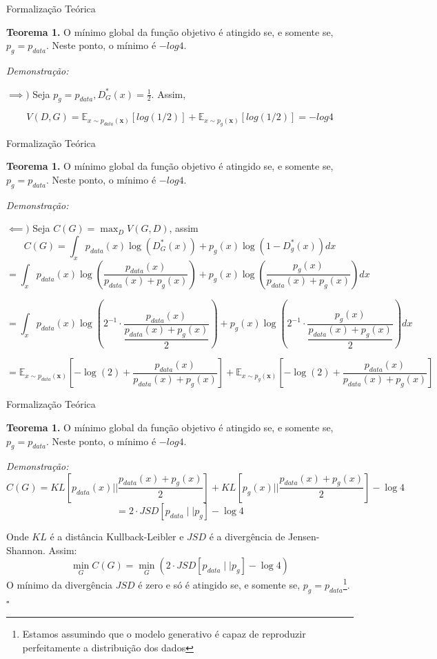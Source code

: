 \documentclass[10pt]{beamer}
\newcommand*{\QEDB}{\hfill\ensuremath{\square}}%
\begin{document}
\begin{frame}[fragile]{Formalização Teórica}

	\textbf{Teorema 1.} O mínimo global da função objetivo
	é atingido se, e somente se, $p_g = p_{data}$. Neste ponto,
	o mínimo é $-log4$.

	\textit{Demonstração:}

	$
	\implies )$
	Seja $p_g = p_{data}, D^*_G(x) = \frac{1}{2}$. Assim,

  $$V(D,G)=
    \mathbb{E}_{x\sim p_{data}(\bm x)}\left[log (1/2) \right]+
    \mathbb{E}_{x\sim p_g(\bm x)}\left[log(1/2)\right] =  -log4
  $$


\end{frame}

\begin{frame}[fragile]{Formalização Teórica}

\small
	\textbf{Teorema 1.} O mínimo global da função objetivo
	é atingido se, e somente se, $p_g = p_{data}$. Neste ponto,
	o mínimo é $-log4$.

	\textit{Demonstração:}

	$
	\impliedby )$ Seja $C(G) = \max_{D}V(G,D)$, assim
  $$C(G) = \int_{x}p_{data}(x)\log{\left(D_{G}^{*}(x)\right)}
  + p_{g}(x)\log{\left(1-D_{g}^{*}(x)\right)}dx $$
  $$
  = \int_{x}p_{data}(x)\log{\left(\dfrac{p_{data}(x)}{p_{data}(x)
  + p_{g}(x)}\right)} + p_{g}(x)\log{\left(\dfrac{p_{g}(x)}{p_{data}(x)
  + p_{g}(x)}\right)}dx $$

  $$= \int_{x}p_{data}(x)
  \log{\left(2^{-1}\cdot \dfrac{p_{data}(x)}{\dfrac{p_{data}(x)
  + p_{g}(x)}{2}}\right)} + p_{g}(x)
  \log{\left(2^{-1}\cdot \dfrac{p_{g}(x)}{\dfrac{p_{data}(x)
  + p_{g}(x)}{2}}\right)}dx	$$

  $$=
    \mathbb{E}_{x\sim p_{data}(\bm x)}\left[-\log (2)+
    \frac{p_{data}(x)}{p_{data}(x)+p_g(x)}\right]+
    \mathbb{E}_{x\sim p_g(\bm x)}\left[-\log(2)+
    \frac{p_{data}(x)}{p_{data}(x)+p_g(x)}\right]
  $$

\end{frame}

\begin{frame}[fragile]{Formalização Teórica}

\small
	\textbf{Teorema 1.} O mínimo global da função objetivo
	é atingido se, e somente se, $p_g = p_{data}$. Neste ponto,
	o mínimo é $-log4$.

	\textit{Demonstração:}
  $$C(G) = KL\left[p_{data}(x)||\dfrac{p_{data}(x)+p_g(x)}{2}\right] + KL\left[p_g(x)||\dfrac{p_{data}(x) + p_g(x)}{2}\right] - \log{4} $$
  $$= 2 \cdot JSD\left[ p_{data} \mid \mid p_g
  \right] - \log 4$$

  Onde $KL$ é a distância Kullback-Leibler e $JSD$ é a divergência
  de Jensen-Shannon. Assim:
  $$\min_G C(G) = \min_G \left( 2 \cdot JSD\left[ p_{data} \mid \mid p_g
  \right] - \log 4 \right)$$
  O mínimo da divergência $JSD$ é zero e só é atingido se, e somente se,
  $p_g = p_{data}$\footnote{Estamos assumindo que o modelo
  generativo é capaz de reproduzir perfeitamente a distribuição dos
  dados}. \QEDB
\end{frame}
\end{document}
